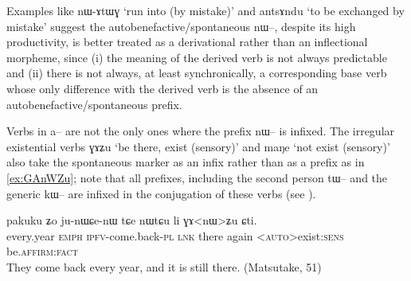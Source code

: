 \documentclass[oldfontcommands,oneside,a4paper,11pt]{article}
\newcommand{\ipa}[1]{{\phon \mbox{#1}}} %
\begin{document}
Examples like \ipa{nɯ-ɤtɯɣ}  `run into (by mistake)' and \ipa{antsɤndu} `to be exchanged by mistake'   suggest the autobenefactive/spontaneous \ipa{nɯ--}, despite its high productivity, is better treated as a derivational rather than an inflectional morpheme, since (i) the meaning of the derived verb is not always predictable and (ii) there is not always, at least synchronically, a corresponding base verb whose only difference with the derived verb is the absence of an autobenefactive/spontaneous prefix.
 
Verbs in \ipa{a--} are not the only ones where the prefix \ipa{nɯ--} is infixed. The irregular existential verbs \ipa{ɣɤʑu} `be there, exist (sensory)'  and \ipa{maŋe} `not exist (sensory)' also take  the spontaneous marker as an infix rather than as a prefix as in \ref{ex:GAnWZu}; note that all prefixes, including the second person \ipa{tɯ--} and the generic \ipa{kɯ--} are infixed in the conjugation of these verbs (see \citealt{jacques12agreement, jacques15generic}).
\begin{exe}
\ex \label{ex:GAnWZu}
\gll 
 \ipa{pakuku}  	\ipa{ʑo}  	\ipa{ju-nɯɕe-nɯ}  	\ipa{tɕe}  	\ipa{nɯtɕu}  	\ipa{li}  	\ipa{ɣɤ<nɯ>ʑu}  	\ipa{ɕti.}  	\\
 every.year \textsc{emph} \textsc{ipfv}-come.back-\textsc{pl} \textsc{lnk} there again <\textsc{auto}>exist:\textsc{sens} be.\textsc{affirm:fact} \\
 \glt They come back every year, and it is still there. (Matsutake, 51)
\end{exe}
\end{document}
